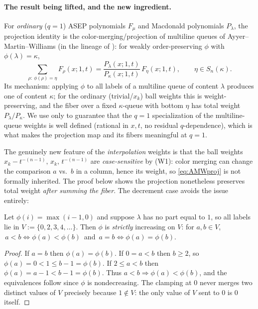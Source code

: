 \paragraph{The result being lifted, and the new ingredient.}
For \emph{ordinary} ($q=1$) ASEP polynomials $F_\mu$ and Macdonald polynomials
$P_\lambda$, the projection identity is the color-merging/projection of multiline
queues of Ayyer--Martin--Williams \cite[Prop.~6.1]{AMW25} (in the lineage of
\cite[\S5]{CMW22}): for weakly order-preserving $\phi$ with $\phi(\lambda)=\kappa$,
\begin{equation}\label{eq:AMWproj}
\sum_{\rho:\ \phi(\rho)=\eta}F_\rho(x;1,t)=\frac{P_\lambda(x;1,t)}{P_\kappa(x;1,t)}\,F_\eta(x;1,t),
\qquad \eta\in S_n(\kappa).
\end{equation}
Its mechanism: applying $\phi$ to all labels of a multiline queue of content
$\lambda$ produces one of content $\kappa$; for the ordinary (trivial/$x_k$) ball
weights this is weight-preserving, and the fiber over a fixed $\kappa$-queue with
bottom $\eta$ has total weight $P_\lambda/P_\kappa$. We use \cite[Thm.~1.1]{AS19}
only to guarantee that the $q=1$ specialization of the multiline-queue weights is
well defined (rational in $x,t$, no residual $q$-dependence), which is what makes
the projection map and its fibers meaningful at $q=1$.

The genuinely new feature of the \emph{interpolation} weights is that the ball
weights $x_k-t^{-(n-1)},\,x_k,\,t^{-(n-1)}$ are \emph{case-sensitive} by (W1):
color merging can change the comparison $a$ vs.\ $b$ in a column, hence its weight,
so \eqref{eq:AMWproj} is not formally inherited. The proof below shows the
projection nonetheless preserves total weight \emph{after summing the fiber}. The
decrement case avoids the issue entirely:

\begin{qthreelemma}\label{lem:strict}
Let $\phi(i)=\max(i-1,0)$ and suppose $\lambda$ has no part equal to $1$, so all
labels lie in $V:=\{0,2,3,4,\dots\}$. Then $\phi$ is \emph{strictly} increasing on
$V$: for $a,b\in V$, $\,a<b\iff\phi(a)<\phi(b)\,$ and $\,a=b\iff\phi(a)=\phi(b)$.
\end{qthreelemma}

\begin{proof}
If $a=b$ then $\phi(a)=\phi(b)$. If $0=a<b$ then $b\ge2$, so
$\phi(a)=0<1\le b-1=\phi(b)$. If $2\le a<b$ then $\phi(a)=a-1<b-1=\phi(b)$. Thus
$a<b\Rightarrow\phi(a)<\phi(b)$, and the equivalences follow since $\phi$ is
nondecreasing. The clamping at $0$ never merges two distinct values of $V$
precisely because $1\notin V$: the only value of $V$ sent to $0$ is $0$ itself.
\end{proof}

